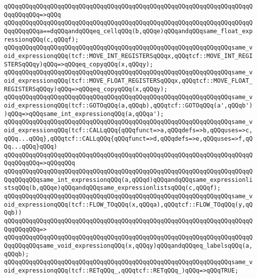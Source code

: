 \verb|qQQqqQQqqQQqqQQqqQQqqQQqqQQqqQQqqQQqqQQqqQQqqQQqqQQqqQQqqQQqqQQqqQQqqQQqqQQqqQQq=>qQQq|\newline
\verb|qQQqqQQqqQQqqQQqqQQqqQQqqQQqqQQqqQQqqQQqqQQqqQQqqQQqqQQqqQQqqQQqqQQqqQQqqQQqqQQqa==dqQQqandqQQqeq_cellqQQq(b,qQQqe)qQQqandqQQqsame_float_expressionqQQq(c,qQQqf);|\newline
\newline
\verb|qQQqqQQqqQQqqQQqqQQqqQQqqQQqqQQqqQQqqQQqqQQqqQQqqQQqqQQqqQQqqQQqsame_void_expressionqQQq(tcf::MOVE_INT_REGISTERSqQQqx,qQQqtcf::MOVE_INT_REGISTERSqQQqy)qQQq=>qQQqeq_copyqQQq(x,qQQqy);|\newline
\verb|qQQqqQQqqQQqqQQqqQQqqQQqqQQqqQQqqQQqqQQqqQQqqQQqqQQqqQQqqQQqqQQqsame_void_expressionqQQq(tcf::MOVE_FLOAT_REGISTERSqQQqx,qQQqtcf::MOVE_FLOAT_REGISTERSqQQqy)qQQq=>qQQqeq_copyqQQq(x,qQQqy);|\newline
\verb|qQQqqQQqqQQqqQQqqQQqqQQqqQQqqQQqqQQqqQQqqQQqqQQqqQQqqQQqqQQqqQQqsame_void_expressionqQQq(tcf::GOTOqQQq(a,qQQqb),qQQqtcf::GOTOqQQq(a',qQQqb'))qQQq=>qQQqsame_int_expressionqQQq(a,qQQqa');|\newline
\newline
\verb|qQQqqQQqqQQqqQQqqQQqqQQqqQQqqQQqqQQqqQQqqQQqqQQqqQQqqQQqqQQqqQQqsame_void_expressionqQQq(tcf::CALLqQQq{qQQqfunct=>a,qQQqdefs=>b,qQQquses=>c,qQQq...qQQq},qQQqtcf::CALLqQQq{qQQqfunct=>d,qQQqdefs=>e,qQQquses=>f,qQQq...qQQq}qQQq)|\newline
\verb|qQQqqQQqqQQqqQQqqQQqqQQqqQQqqQQqqQQqqQQqqQQqqQQqqQQqqQQqqQQqqQQqqQQqqQQqqQQqqQQq=>qQQqqQQq|\newline
\verb|qQQqqQQqqQQqqQQqqQQqqQQqqQQqqQQqqQQqqQQqqQQqqQQqqQQqqQQqqQQqqQQqqQQqqQQqqQQqqQQqsame_int_expressionqQQq(a,qQQqd)qQQqandqQQqsame_expressionlistsqQQq(b,qQQqe)qQQqandqQQqsame_expressionlistsqQQq(c,qQQqf);|\newline
\newline
\verb|qQQqqQQqqQQqqQQqqQQqqQQqqQQqqQQqqQQqqQQqqQQqqQQqqQQqqQQqqQQqqQQqsame_void_expressionqQQq(tcf::FLOW_TOqQQq(x,qQQqa),qQQqtcf::FLOW_TOqQQq(y,qQQqb))|\newline
\verb|qQQqqQQqqQQqqQQqqQQqqQQqqQQqqQQqqQQqqQQqqQQqqQQqqQQqqQQqqQQqqQQqqQQqqQQqqQQqqQQq=>|\newline
\verb|qQQqqQQqqQQqqQQqqQQqqQQqqQQqqQQqqQQqqQQqqQQqqQQqqQQqqQQqqQQqqQQqqQQqqQQqqQQqqQQqsame_void_expressionqQQq(x,qQQqy)qQQqandqQQqeq_labelsqQQq(a,qQQqb);|\newline
\newline
\verb|qQQqqQQqqQQqqQQqqQQqqQQqqQQqqQQqqQQqqQQqqQQqqQQqqQQqqQQqqQQqqQQqsame_void_expressionqQQq(tcf::RETqQQq_,qQQqtcf::RETqQQq_)qQQq=>qQQqTRUE;|\newline
